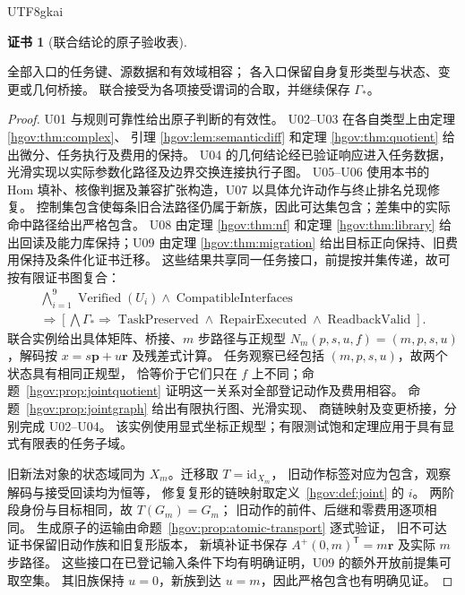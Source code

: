 \documentclass[12pt,a4paper,openany,notitlepage]{report}
\theoremstyle{plain}
\theoremstyle{definition}
\newtheorem*{certificate}{证书}
\theoremstyle{remark}
\begin{document}
\begin{CJK*}{UTF8}{gkai}
\begin{certificate}[联合结论的原子验收表]
\begin{center}
\end{center}
全部入口的任务键、源数据和有效域相容；
各入口保留自身复形类型与状态、变更或几何桥接。
联合接受为各项接受谓词的合取，并继续保存 $\Gamma_*$。
\end{certificate}
\begin{proof}
U01 与规则可靠性给出原子判断的有效性。
U02--U03 在各自类型上由定理 \ref{hgov:thm:complex}、
引理 \ref{hgov:lem:semanticdiff} 和定理 \ref{hgov:thm:quotient}
给出微分、任务执行及费用的保持。
U04 的几何结论经已验证响应进入任务数据，
光滑实现以实际参数化路径及边界交换连接执行子图。
U05--U06 使用本书的 Hom 填补、核像判据及兼容扩张构造，U07 以具体允许动作与终止排名兑现修复。
控制集包含使每条旧合法路径仍属于新族，因此可达集包含；差集中的实际命中路径给出严格包含。
U08 由定理 \ref{hgov:thm:nf} 和定理 \ref{hgov:thm:library}
给出回读及能力库保持；U09 由定理 \ref{hgov:thm:migration}
给出目标正向保持、旧费用保持及条件化证书迁移。
这些结果共享同一任务接口，前提按并集传递，故可按有限证书图复合：
\[
\begin{gathered}
\bigwedge_{i=1}^{9}\operatorname{Verified}(U_i)
\land\operatorname{CompatibleInterfaces}\\
\Rightarrow
\left[
\bigwedge\Gamma_*\Rightarrow
\operatorname{TaskPreserved}
\land\operatorname{RepairExecuted}
\land\operatorname{ReadbackValid}
\right].
\end{gathered}
\]
联合实例给出具体矩阵、桥接、$m$ 步路径与正规型
$N_m(p,s,u,f)=(m,p,s,u)$，解码按 $x=s\mathbf p+u\mathbf r$ 及残差式计算。
任务观察已经包括 $(m,p,s,u)$，故两个状态具有相同正规型，
恰等价于它们只在 $f$ 上不同；命题~\ref{hgov:prop:jointquotient}
证明这一关系对全部登记动作及费用相容。
命题~\ref{hgov:prop:jointgraph} 给出有限执行图、光滑实现、
商链映射及变更桥接，分别完成 U02--U04。
该实例使用显式坐标正规型；有限测试饱和定理应用于具有显式有限表的任务子域。

旧新法对象的状态域同为 $X_m$。迁移取 $T=\mathrm{id}_{X_m}$，
旧动作标签对应为包含，观察解码与接受回读均为恒等，
修复复形的链映射取定义~\ref{hgov:def:joint} 的 $i$。
两阶段身份与目标相同，故 $T(G_m)=G_m$；
旧动作的前件、后继和零费用逐项相同。
生成原子的运输由命题~\ref{hgov:prop:atomic-transport} 逐式验证，
旧不可达证书保留旧动作族和旧复形版本，
新填补证书保存 $A^+(0,m)^{\mathsf T}=m\mathbf r$ 及实际 $m$ 步路径。
这些接口在已登记输入条件下均有明确证明，U09 的额外开放前提集可取空集。
其旧族保持 $u=0$，新族到达 $u=m$，因此严格包含也有明确见证。
\end{proof}


\end{CJK*}
\end{document}
